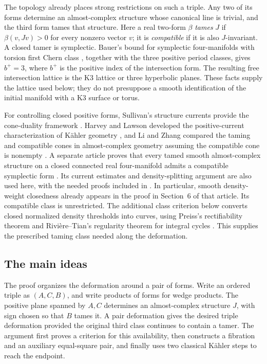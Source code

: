The topology already places strong restrictions on such a triple.
Any two of its forms determine an almost-complex structure whose
canonical line is trivial, and the third form tames that structure.
Here a real two-form $\beta$ \emph{tames} $J$ if
$\beta(v,Jv)>0$ for every nonzero vector $v$; it is
\emph{compatible} if it is also $J$-invariant. A closed tamer is
symplectic. Bauer's bound for symplectic four-manifolds with torsion
first Chern class \cite[Corollary~1.2]{Bauer2008}, together with the
three positive period classes, gives $b^+=3$, where $b^+$ is the
positive index of the intersection form. The resulting free
intersection lattice is the K3 lattice or three hyperbolic planes.
These facts supply the lattice used below; they do not presuppose a
smooth identification of the initial manifold with a K3 surface or torus.

For controlling closed positive forms, Sullivan's structure currents
provide the cone-duality framework \cite{Sullivan1976}.
Harvey and Lawson developed the positive-current characterization of
K\"ahler geometry \cite{HarveyLawson1983}, and Li and Zhang compared
the taming and compatible cones in almost-complex geometry
assuming the compatible cone is nonempty \cite{LiZhang2009}.
A separate article proves that every tamed smooth
almost-complex structure on a closed connected real four-manifold admits a compatible
symplectic form \cite[Theorem~1.1]{OpenAITaming2026}. Its current
estimates and density-splitting argument are also used here, with the
needed proofs included in .
In particular, smooth density-weight closedness already appears in
the proof in Section~6 of that article. Its compatible class is
unrestricted. The additional class criterion below converts closed
normalized density thresholds into curves, using Preiss's
rectifiability theorem and Rivi\`ere--Tian's regularity theorem for
integral cycles \cite{Preiss1987,RiviereTian2009}. This supplies the
prescribed taming class needed along the deformation.

\subsection{The main ideas}

The proof organizes the deformation around a pair of forms. Write an
ordered triple as $(A,C,B)$, and write products of forms for wedge
products. The positive plane spanned by $A,C$
determines an almost-complex structure $J$, with sign chosen so that
$B$ tames it. A pair deformation gives the desired triple deformation
provided the original third class continues to contain a tamer.
The argument first proves a criterion for this availability, then
constructs a fibration and an auxiliary equal-square pair, and finally
uses two classical K\"ahler steps to reach the endpoint.

